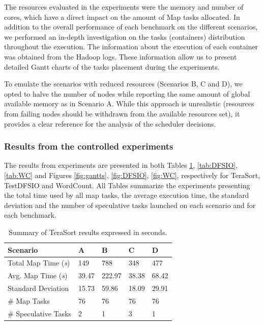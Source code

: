 The resources evaluated in the experiments were the memory and number of cores, which have a direct impact on the amount of Map tasks allocated. In addition to the overall performance of each benchmark on the different scenarios, we performed an in-depth investigation on the tasks (containers) distribution throughout the execution. The information about the execution of each container was obtained from the Hadoop logs. These information allow us to present detailed Gantt charts of the tasks placement during the experiments.

To emulate the scenarios with reduced resources (Scenarios B, C and D), we opted to halve the number of nodes while reporting the same amount of global available memory as in Scenario A. While this approach is unrealistic (resources from failing nodes should be withdrawn from the available resources set), it provides a clear reference for the analysis of the scheduler decisions. 


\subsubsection*{Results from the controlled experiments\label{sec:5.4}} 


The results from experiments are presented in both  Tables \ref{tab:resumo}, \ref{tab:DFSIO}, \ref{tab:WC} and Figures \ref{fig:gantts}, \ref{fig:DFSIO}, \ref{fig:WC}, respectively for TeraSort, TestDFSIO and WordCount. All Tables summarize the experiments presenting the total time used by all map tasks, the average execution time, the standard deviation  and the number of speculative tasks launched on each scenario and for each benchmark. 

\begin{table}[h!]
	\caption{Summary of TeraSort results expressed in seconds.} \label{tab:resumo}
	\begin{tabular*}{\hsize}{lllll} 
		\textbf{Scenario} & \textbf{A} & \textbf{B} & \textbf{C} & \textbf{D}\\
		\hline
		Total Map Time ({\it{s}}) & 149 & 788 & 348 & 477 \\
		Avg. Map Time ({\it{s}}) & 39.47 & 222.97 & 38.38 & 68.42 \\
		Standard Deviation & 15.73 & 59.86 & 18.09 & 29.91 \\
		\# Map Tasks & 76 & 76 & 76 & 76 \\
		\# Speculative Tasks & 2 & 1 & 3 & 1 \\
	\end{tabular*}
\end{table}

